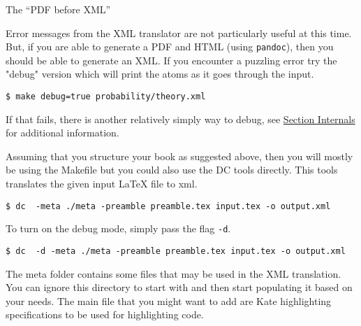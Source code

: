 \begin{note}
The ``PDF before XML''
\end{note}

\begin{gram}
Error messages from the XML translator are not particularly useful at this time.  But, if you are able to generate a PDF and HTML (using \lstinline`pandoc`), then you should be able to generate an XML. 
%
If you encounter a puzzling error try the "debug" version which will print the atoms as it goes through the input.
%
\begin{lstlisting}
$ make debug=true probability/theory.xml
\end{lstlisting}

If that fails, there is another relatively simply way to debug, see \href{sec:dc::internals}{Section Internals} for additional information.
\end{gram}

\begin{gram}
Assuming that you structure your book as suggested above, then you will mostly be using the Makefile but you could also use the DC tools directly. 
%
This tools translates the given input LaTeX file to xml.

\begin{lstlisting}
$ dc  -meta ./meta -preamble preamble.tex input.tex -o output.xml
\end{lstlisting}

To turn on the debug mode, simply pass the flag \lstinline`-d`.
\begin{lstlisting}
$ dc  -d -meta ./meta -preamble preamble.tex input.tex -o output.xml
\end{lstlisting}

The meta folder contains some files that may be used in the XML translation.  You can ignore this directory to start with and then start populating it based on your needs.  The main file that you might want to add are Kate highlighting specifications to be used for highlighting code.
\end{gram}




